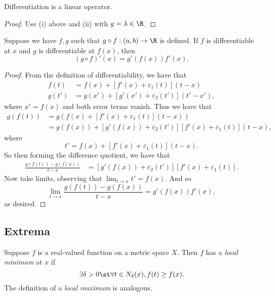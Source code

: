 \documentclass{notes}
\begin{document}
\begin{theorem}[Linearity]
  Differentiation is a linear operator.  
\end{theorem}
\begin{proof}
  Use (i) above and (ii) with $g = \lambda\in\R$.
\end{proof}

\begin{theorem}
  Suppose we have $f,g$ such that $g \circ f: (a,b) \to \R$ is defined. If $f$ is differentiable at  
  $x$ and $g$ is differentiable at $f(x)$, then $$(g \circ f)'(x) = g'(f(x))f'(x).$$
\end{theorem}
\begin{proof}
  From the definition of differentiability, we have that 
  \begin{align*}
    f(t) &= f(x) + \left[ f'(x) + \varepsilon_1(t)  \right](t-x) \\
    g(t') &= g(x') + \left[ g'(x') + \varepsilon_2(t')  \right](t'-x'),
  \end{align*}
  where $x' = f(x)$ and both error terms vanish.
  Thus we have that 
  \begin{align}
    g(f(t)) &= g \left( f(x) + \left[ f'(x) + \varepsilon_1(t) \right](t-x) \right) \\
            &= g(f(x)) + \left[ g'(f(x)) + \varepsilon_2(t') \right] \left[ f'(x) + \varepsilon_1(t) \right] (t-x),
  \end{align}
  where $$t' = f(x) + \left[ f'(x) + \varepsilon_1(t) \right](t-x).$$ So then forming the difference quotient,
  we have that 
  \begin{align*}
    \frac{g(f(t)) - g(f(x))}{t - x} &= \left[ g'(f(x)) + \varepsilon_2(t') \right] \left[ f'(x) + \varepsilon_1(t) \right].
  \end{align*}
  Now take limits, observing that $\lim_{t\to x}t' = f(x)$. And so 
  $$\lim_{t\to x} \frac{g(f(t)) - g(f(x))}{t - x} = g'(f(x))f'(x),$$ as desired.
\end{proof}

\subsection{Extrema}
\begin{defn}
  Suppose $f$ is a real-valued function on a metric space $X$. Then $f$ has a \emph{local minimum} at 
  $x$ if $$\exists \delta > 0 \st \forall t\in N_{\delta}(x), f(t) \geq f(x).$$ The definition of a 
  \emph{local maximum} is analogous.
\end{defn}
\end{document}
